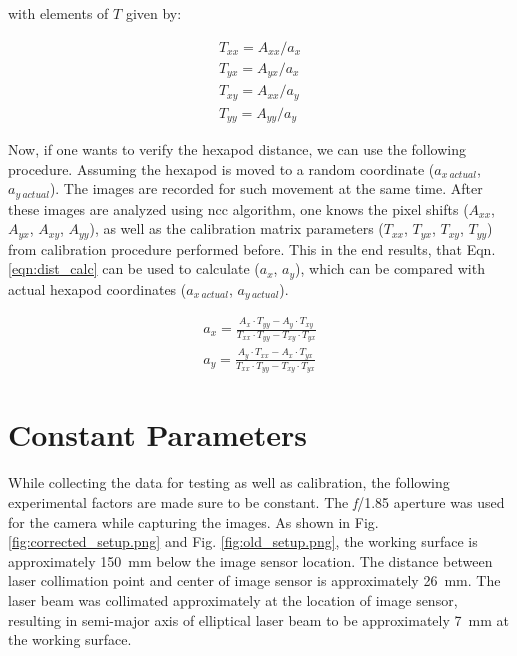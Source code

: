         \noindent with elements of $T$ given by:

        \begin{equation}\label{eqn:calib_matrix_param}
            \begin{aligned}
                T_{xx} = A_{xx} / a_x \\ 
                T_{yx} = A_{yx} / a_x \\
                T_{xy} = A_{xx} / a_y \\
                T_{yy} = A_{yy} / a_y 
            \end{aligned}
        \end{equation}

        \vspace{5mm}
        \noindent Now, if one wants to verify the hexapod distance, we can use the following procedure. Assuming the hexapod is moved to a random coordinate ($a_{x\ actual}$, $a_{y\ actual}$). The images are recorded for such movement at the same time. After these images are analyzed using \gls{ncc} algorithm, one knows the pixel shifts ($A_{xx}$, $A_{yx}$, $A_{xy}$, $A_{yy}$),  as well as the calibration matrix parameters ($T_{xx}$, $T_{yx}$, $T_{xy}$, $T_{yy}$) from calibration procedure performed before. This in the end results, that Eqn. \ref{eqn:dist_calc} can be used to calculate ($a_x$, $a_y$), which can be compared with actual hexapod coordinates ($a_{x\ actual}$, $a_{y\ actual}$). 

        \begin{equation}\label{eqn:dist_calc}
            \begin{aligned}
                a_x = \frac{A_x \cdot T_{yy} - A_y \cdot T_{xy}}{T_{xx} \cdot T_{yy} - T_{xy} \cdot T_{yx}} \\
                a_y = \frac{A_y \cdot T_{xx} - A_x \cdot T_{yx}}{T_{xx} \cdot T_{yy} - T_{xy} \cdot T_{yx}}
            \end{aligned}
        \end{equation}

\section{Constant Parameters}\label{section:constant_parameters}
    \noindent While collecting the data for testing as well as calibration, the following experimental factors are made sure to be constant. The \emph{f}/1.85 aperture was used for the camera while capturing the images. As shown in Fig. \ref{fig:corrected_setup.png} and Fig. \ref{fig:old_setup.png}, the working surface is approximately \SI{150}{\milli\meter} below the image sensor location. The distance between laser collimation point and center of image sensor is approximately \SI{26}{\milli\meter}. The laser beam was collimated approximately at the location of image sensor, resulting in semi-major axis of elliptical laser beam to be approximately \SI{7}{\milli\meter} at the working surface.
    
